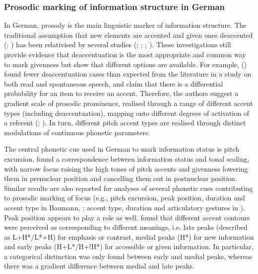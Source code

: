 \subsubsection{Prosodic marking of information structure in German}
\hypertarget{Toc191305888}{}
In German, prosody is the main linguistic marker of information structure. The traditional assumption that new elements are accented and given ones deaccented (\citealt{Allerton1978}; \citealt{Cruttenden2006}) has been relativised by several studies (\citealt{Baumann2005}; \citealt{BaumannHadelich2003}; \citealt{KüglerFéry2017}; \citealt{Wagner1999}). These investigations still provide evidence that deaccentuation is the most appropriate and common way to mark givenness but show that different options are available. For example, (\citealt{BaumannRiester2013}) found fewer deaccentuation cases than expected from the literature in a study on both read and spontaneous speech, and claim that there is a differential probability for an item to receive an accent. Therefore, the authors suggest a gradient scale of prosodic prominence, realised through a range of different accent types (including deaccentuation), mapping onto different degrees of activation of a referent (\citealt{Baumann2006}; \citealt{BaumannRiester2013}). In turn, different pitch accent types are realised through distinct modulations of continuous phonetic parameters.

The central phonetic cue used in German to mark information status is pitch excursion. \citet{FéryKügler2008} found a correspondence between information status and tonal scaling, with narrow focus raising the high tones of pitch accents and givenness lowering them in prenuclear position and cancelling them out in postnuclear position. Similar results are also reported for analyses of several phonetic cues contributing to prosodic marking of focus (e.g., pitch excursion, peak position, duration and accent type in Baumann, \citealt{GriceSteindamm2006a}; accent type, duration and articulatory gestures in \citealt{HermesEtAl2008}). Peak position appears to play a role as well. \citet{Kohler1991} found that different accent contours were perceived as corresponding to different meanings, i.e. late peaks (described as L+H*/L*+H) for emphasis or contrast, medial peaks (H*) for new information and early peaks (H+L*/H+!H*) for accessible or given information. In particular, a categorical distinction was only found between early and medial peaks, whereas there was a gradient difference between medial and late peaks. 


